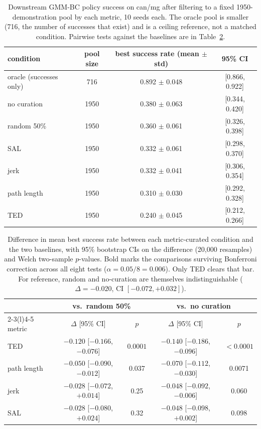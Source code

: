 \documentclass[10pt]{article}
\begin{document}
\begin{table}[t]
\centering
\small
\begin{tabular}{lccc}
\toprule
condition & pool size & best success rate (mean $\pm$ std) & 95\% CI \\
\midrule
oracle (successes only) & 716 & 0.892 $\pm$ 0.048 & [0.866, 0.922] \\
\midrule
no curation             & 1950 & 0.380 $\pm$ 0.063 & [0.344, 0.420] \\
random 50\%             & 1950 & 0.360 $\pm$ 0.061 & [0.326, 0.398] \\
\midrule
SAL                     & 1950 & 0.332 $\pm$ 0.061 & [0.298, 0.370] \\
jerk                    & 1950 & 0.332 $\pm$ 0.041 & [0.306, 0.354] \\
path length             & 1950 & 0.310 $\pm$ 0.030 & [0.292, 0.328] \\
TED                     & 1950 & 0.240 $\pm$ 0.045 & [0.212, 0.266] \\
\bottomrule
\end{tabular}
\caption{Downstream GMM-BC policy success on can/mg after filtering to a
fixed 1950-demonstration pool by each metric, 10 seeds each. The oracle pool
is smaller (716, the number of successes that exist) and is a ceiling
reference, not a matched condition. Pairwise tests against the baselines are
in Table~\ref{tab:tests}.}
\label{tab:training}
\end{table}

\begin{table}[t]
\centering
\small
\begin{tabular}{lcccc}
\toprule
& \multicolumn{2}{c}{vs.\ random 50\%} & \multicolumn{2}{c}{vs.\ no curation} \\
\cmidrule(lr){2-3}\cmidrule(l){4-5}
metric & $\Delta$ [95\% CI] & $p$ & $\Delta$ [95\% CI] & $p$ \\
\midrule
TED         & $-0.120$ [$-0.166$, $-0.076$] & $\mathbf{0.0001}$ & $-0.140$ [$-0.186$, $-0.096$] & $\mathbf{<0.0001}$ \\
path length & $-0.050$ [$-0.090$, $-0.012$] & 0.037 & $-0.070$ [$-0.112$, $-0.030$] & 0.0071 \\
jerk        & $-0.028$ [$-0.072$, $+0.014$] & 0.25 & $-0.048$ [$-0.092$, $-0.006$] & 0.060 \\
SAL         & $-0.028$ [$-0.080$, $+0.024$] & 0.32 & $-0.048$ [$-0.098$, $+0.002$] & 0.098 \\
\bottomrule
\end{tabular}
\caption{Difference in mean best success rate between each metric-curated
condition and the two baselines, with 95\% bootstrap CIs on the difference
(20{,}000 resamples) and Welch two-sample $p$-values. Bold marks the
comparisons surviving Bonferroni correction across all eight tests
($\alpha = 0.05/8 = 0.006$). Only TED clears that bar. For reference,
random and no-curation are themselves indistinguishable
($\Delta = -0.020$, CI $[-0.072, +0.032]$).}
\label{tab:tests}
\end{table}
\end{document}
